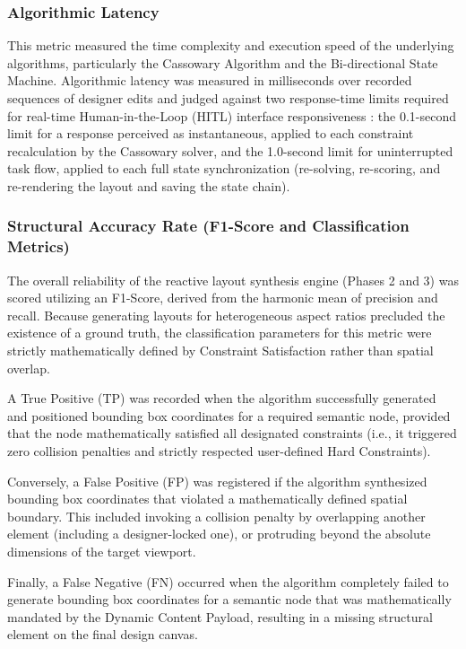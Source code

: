 \begin{refsection}
\subsubsection{Algorithmic Latency}
This metric measured the time complexity and execution speed of the underlying algorithms, particularly the Cassowary Algorithm and the Bi-directional State Machine. Algorithmic latency was measured in milliseconds over recorded sequences of designer edits and judged against two response-time limits required for real-time Human-in-the-Loop (HITL) interface responsiveness \cite{nielsen1993usability}: the 0.1-second limit for a response perceived as instantaneous, applied to each constraint recalculation by the Cassowary solver, and the 1.0-second limit for uninterrupted task flow, applied to each full state synchronization (re-solving, re-scoring, and re-rendering the layout and saving the state chain).

\subsubsection{Structural Accuracy Rate (F1-Score and Classification Metrics)}
The overall reliability of the reactive layout synthesis engine (Phases 2 and 3) was scored utilizing an F1-Score, derived from the harmonic mean of precision and recall. Because generating layouts for heterogeneous aspect ratios precluded the existence of a ground truth, the classification parameters for this metric were strictly mathematically defined by Constraint Satisfaction rather than spatial overlap.

A True Positive (TP) was recorded when the algorithm successfully generated and positioned bounding box coordinates for a required semantic node, provided that the node mathematically satisfied all designated constraints (i.e., it triggered zero collision penalties and strictly respected user-defined Hard Constraints).

Conversely, a False Positive (FP) was registered if the algorithm synthesized bounding box coordinates that violated a mathematically defined spatial boundary. This included invoking a collision penalty by overlapping another element (including a designer-locked one), or protruding beyond the absolute dimensions of the target viewport.

Finally, a False Negative (FN) occurred when the algorithm completely failed to generate bounding box coordinates for a semantic node that was mathematically mandated by the Dynamic Content Payload, resulting in a missing structural element on the final design canvas.


\end{refsection}
